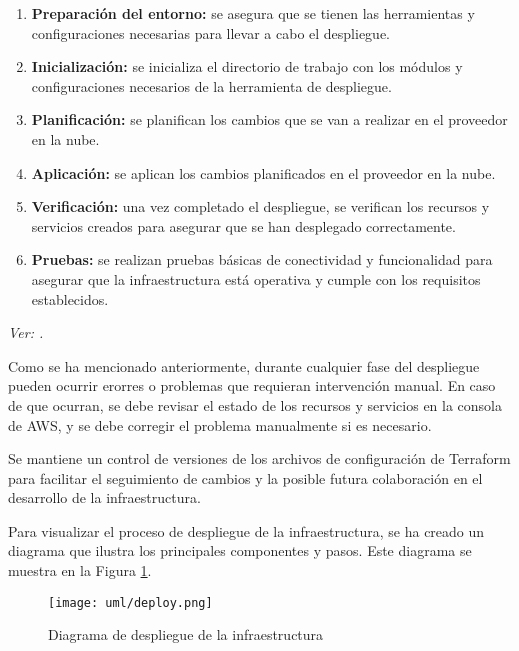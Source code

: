 \begin{enumerate}
    \item \textbf{Preparación del entorno:} se asegura que se tienen las
      herramientas y configuraciones necesarias para llevar a cabo el
      despliegue.

    \item \textbf{Inicialización:} se inicializa el directorio de trabajo con
      los módulos y configuraciones necesarios de la herramienta de despliegue.

    \item \textbf{Planificación:} se planifican los cambios que se van a
      realizar en el proveedor en la nube.

    \item \textbf{Aplicación:} se aplican los cambios planificados en el
      proveedor en la nube.

    \item \textbf{Verificación:} una vez completado el despliegue,
      se verifican los recursos y servicios creados para asegurar que se han
      desplegado correctamente.

    \item \textbf{Pruebas:} se realizan pruebas básicas de conectividad y
      funcionalidad para asegurar que la infraestructura está operativa y
      cumple con los requisitos establecidos.
\end{enumerate}

\emph{Ver: .}

Como se ha mencionado anteriormente, durante cualquier fase del despliegue
pueden ocurrir erorres o problemas que requieran intervención manual. En caso
de que ocurran, se debe revisar el estado de los recursos y servicios en la
consola de AWS, y se debe corregir el problema manualmente si es necesario.

Se mantiene un control de versiones de los archivos de
configuración de Terraform para facilitar el seguimiento de cambios y la
posible futura colaboración en el desarrollo de la infraestructura.

Para visualizar el proceso de despliegue de la infraestructura, se ha creado
un diagrama que ilustra los principales componentes y pasos. Este diagrama se
muestra en la Figura \ref{fig:diagrama_despliegue}.

\begin{figure}[H]
    \centering
    \texttt{[image: uml/deploy.png]}
    \caption{Diagrama de despliegue de la infraestructura}
    \label{fig:diagrama_despliegue}
\end{figure}

